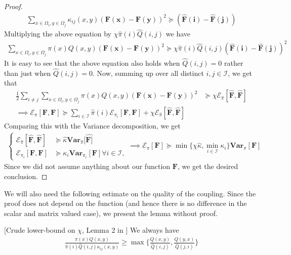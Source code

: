 \begin{proof}
\begin{align*}
  \sum\limits_{x\in\Omega_i, y\in\Omega_j}\kappa_{ij}(x,y)(\mathbf{F(x)}-\mathbf{F(y)})^2 \succeq (\mathbf{\hat{F}(i)}-\mathbf{\hat{F}(j)})
\end{align*}
Multiplying the above equation by $\chi\hat{\pi}(i)\hat{Q}(i,j)$ we have
\begin{align*}
  \sum\limits_{x\in\Omega_i,y\in\Omega_j}\pi(x)Q(x,y)(\mathbf{F(x)}-\mathbf{F(y)})^2 \succeq \chi \hat{\pi}(i)\hat{Q}(i,j)(\mathbf{\hat{F}(i)}-\mathbf{\hat{F}(j)})^2
\end{align*}
It is easy to see that the above equation also holds when $\hat{Q}(i,j)=0$ rather than just when $\hat{Q}(i,j)=0$. Now, summing up over all distinct $i,j\in \mathcal{I}$, we get that
\begin{align*}
  \frac{1}{2}\sum\limits_{i \neq j}\sum\limits_{x\in\Omega_i, y \in \Omega_j}\pi(x)Q(x,y)(\mathbf{F(x)}-\mathbf{F(y)})^2&\succeq\chi \mathcal{E}_{\hat{\pi}}[\mathbf{\hat{F}},\mathbf{\hat{F}}]\\
  \implies \mathcal{E}_\pi[\mathbf{F},\mathbf{F}]\succeq \sum\limits_{i \in \mathcal{I}}\hat{\pi}(i)\mathcal{E}_{\pi_i}[\mathbf{F},\mathbf{F}]+\chi\mathcal{E}_{\hat{\pi}}[\mathbf{\hat{F}},\mathbf{\hat{F}}]
  \end{align*}
Comparing this with the Variance decomposition, we get
  \begin{align*}\begin{cases}
  \mathcal{E_{\hat{\pi}}}[\mathbf{\hat{F}},\mathbf{\hat{F}}]&\succeq \hat{\kappa}\mathbf{Var}_{\hat{\pi}}[\mathbf{\hat{F]}}\\
  \mathcal{E}_{\pi_i}[\mathbf{F},\mathbf{F}]&\succeq \kappa_{i}\mathbf{Var}_{\pi_{i}}[\mathbf{F}]\forall i\in\mathcal{I},
  \end{cases}\implies\mathcal{E}_{\pi}[\mathbf{F}]\succeq\min\{\chi\hat{\kappa},\min_{i\in\mathcal{{I}}}\kappa_{i}\}\mathbf{Var}_{\pi}[\mathbf{F}]
\end{align*}
Since we did not assume anything about our function $\mathbf{F}$, we get the desired conclusion.
\end{proof}

We will also need the following estimate on the quality of the coupling. Since the proof does not depend on the function (and hence there is no difference in the scalar and matrix valued case), we present the lemma without proof.
\begin{lemma}{[Crude lower-bound on $\chi$, Lemma 2 in \cite{HS19}]} We always have
  \begin{align*}
    \frac{\pi(x) Q(x,y)}{\hat{\pi}(i) \hat{Q}(i,j)\kappa_{ij}(x,y)}\geq \max\bigg\{\frac{Q(x,y)}{\hat{Q}(i,j)},\frac{Q(y,x)}{\hat{Q}(j,i)}\bigg\}
  \end{align*}
\end{lemma}
